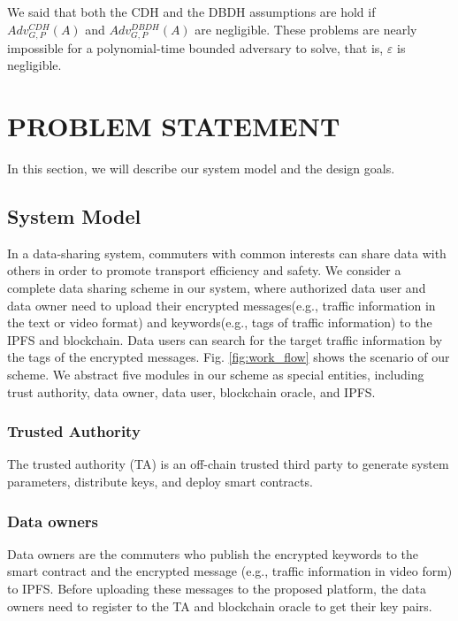 \documentclass[journal]{IEEEtran}
\begin{document}
    We said that both the CDH and the DBDH assumptions are hold if %
    $Adv_{G,P}^{CDH}(A)$ and $Adv_{G,P}^{DBDH}(A)$ are negligible. These problems are nearly impossible for a polynomial-time bounded adversary to solve, that is, $\varepsilon$ is negligible.

    \section{PROBLEM STATEMENT}
    
    In this section, we will describe our system model and the design goals.
    
    \subsection{System Model} 
    
    In a data-sharing system, commuters with common interests can share data with others in order to promote transport efficiency and safety. We consider a complete data sharing scheme in our system, where authorized data user and data owner need to upload their encrypted messages(e.g., traffic information in the text or video format) and keywords(e.g., tags of traffic information) to the IPFS and blockchain. Data users can search for the target traffic information by the tags of the encrypted messages. Fig. \ref{fig:work_flow} shows the scenario of our scheme. We abstract five modules in our scheme as special entities, including trust authority, data owner, data user, blockchain oracle, and IPFS.

    \subsubsection{\textbf{Trusted Authority}}
    
    The trusted authority (TA) is an off-chain trusted third party to generate system parameters, distribute keys, and deploy smart contracts.

    \subsubsection{\textbf{Data owners}}
    
    Data owners are the commuters who publish the encrypted keywords to the smart contract and the encrypted message (e.g., traffic information in video form) to IPFS. Before uploading these messages to the proposed platform, the data owners need to register to the TA and blockchain oracle to get their key pairs.
    
\end{document}
